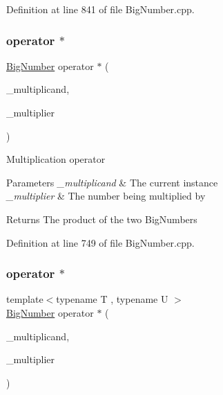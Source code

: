 Definition at line 841 of file Big\+Number.\+cpp.

\mbox{\label{class_big_nums_1_1_big_number_a390a7b0928f684129947af34272b1def}} 
\subsubsection{\texorpdfstring{operator $\ast$}{operator *}\hspace{0.1cm}{\footnotesize\ttfamily [1/2]}}
{\footnotesize\ttfamily \mbox{\hyperlink{class_big_nums_1_1_big_number}{Big\+Number}} operator $\ast$ (\begin{DoxyParamCaption}\item[{\mbox{\hyperlink{class_big_nums_1_1_big_number}{Big\+Number}}}]{\+\_\+multiplicand,  }\item[{const \mbox{\hyperlink{class_big_nums_1_1_big_number}{Big\+Number}} \&}]{\+\_\+multiplier }\end{DoxyParamCaption})\hspace{0.3cm}{\ttfamily [friend]}}

Multiplication operator 
\begin{DoxyParams}{Parameters}
{\em \+\_\+multiplicand} & The current instance \\
\hline
{\em \+\_\+multiplier} & The number being multiplied by \\
\hline
\end{DoxyParams}
\begin{DoxyReturn}{Returns}
The product of the two Big\+Numbers 
\end{DoxyReturn}


Definition at line 749 of file Big\+Number.\+cpp.

\mbox{\label{class_big_nums_1_1_big_number_ad33abbbc2055753a8b76762a6d5ef947}} 
\subsubsection{\texorpdfstring{operator $\ast$}{operator *}\hspace{0.1cm}{\footnotesize\ttfamily [2/2]}}
{\footnotesize\ttfamily template$<$typename T , typename U $>$ \\
\mbox{\hyperlink{class_big_nums_1_1_big_number}{Big\+Number}} operator $\ast$ (\begin{DoxyParamCaption}\item[{const T \&}]{\+\_\+multiplicand,  }\item[{const U \&}]{\+\_\+multiplier }\end{DoxyParamCaption})\hspace{0.3cm}{\ttfamily [friend]}}



